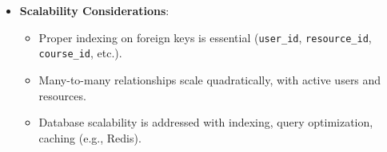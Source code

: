 \begin{itemize}
    \item \textbf{Scalability Considerations}:
    \begin{itemize}
        \item Proper indexing on foreign keys is essential (\texttt{user\_id}, \texttt{resource\_id}, \texttt{course\_id}, etc.).
        \item Many-to-many relationships scale quadratically, with active users and resources.
        \item Database scalability is addressed with indexing, query optimization, caching (e.g., Redis).
    \end{itemize}
\end{itemize}
